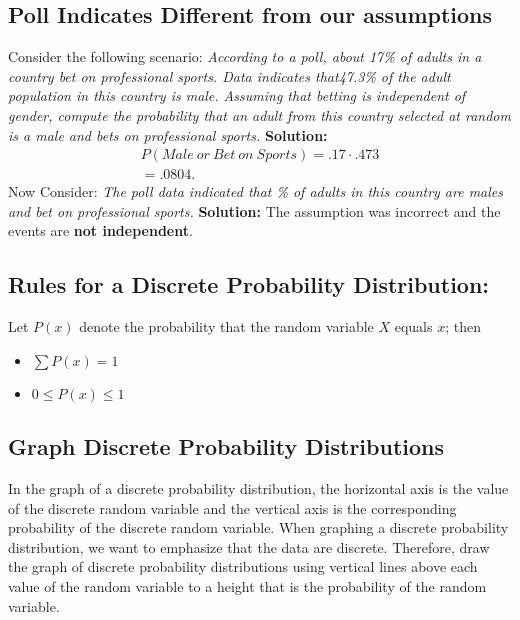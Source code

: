 \documentclass{report}
\begin{document}
    \subsection*{Poll Indicates Different from our assumptions}
    \bigbreak \noindent 
    Consider the following scenario:
    \bigbreak \noindent 
    \textit{According to a​ poll, about ​17\% of adults in a country bet on professional sports. Data indicates that ​47.3\% of the adult population in this country is male. Assuming that betting is independent of​ gender, compute the probability that an adult from this country selected at random is a male and bets on professional sports.}
    \bigbreak \noindent 
      \textbf{Solution:}
      \bigbreak \noindent 
      \begin{align*}
        P(Male\ or\ Bet\ on\ Sports) = .17 \cdot .473 \\
        = .0804
      .\end{align*}
      \bigbreak \noindent 
      Now Consider:
      \bigbreak \noindent 
      \textit{The poll data indicated that ​\% of adults in this country are males and bet on professional sports. }
      \bigbreak \noindent 
      \textbf{Solution:}
      \bigbreak \noindent 
      The assumption was incorrect and the events are \textbf{not independent}.
      
      \bigbreak \noindent \bigbreak \noindent 
      \subsection*{Rules for a Discrete Probability Distribution:}
      \bigbreak \noindent 
      Let $P(x)$ denote the probability that the random variable $X$ equals $x$; then
      \begin{itemize}
          \item $ \sum P(x) = 1 $
          \item $0 \leq P(x) \leq 1$
      \end{itemize}

      \pagebreak 
      \subsection*{Graph Discrete Probability Distributions}
        \bigbreak \noindent 
      In the graph of a discrete probability distribution, the horizontal axis is the value of the discrete random variable and the vertical axis is the corresponding probability of the discrete random variable. When graphing a discrete probability distribution, we want to emphasize that the data are discrete. Therefore, draw the graph of discrete probability distributions using vertical lines above each value of the random variable to a height that is the probability of the random variable.
      \bigbreak \noindent 
      \begin{figure}[ht]
          \centering
          \label{fig:enumac}
      \end{figure}
\end{document}
